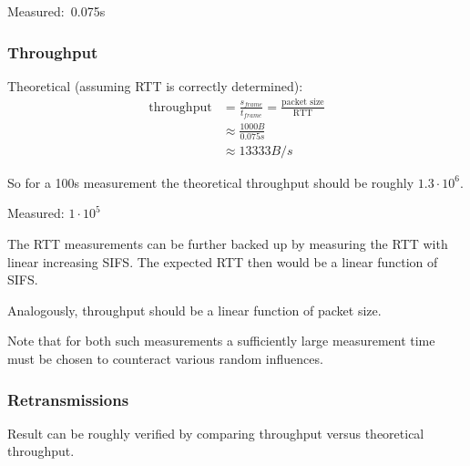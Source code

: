 \documentclass{article}
\begin{document}
\bigskip

Measured:~0.075s 

\subsubsection{Throughput}

\bigskip

Theoretical (assuming RTT is correctly determined):
\begin{equation*}
\begin{split}
	\text{throughput} & = \frac{s_{frame}}{t_{frame}} = \frac{\text{packet size}}{\text{RTT}} \\
	& \approx \frac{1000B}{0.075s} \\
	& \approx 13333B/s
\end{split}
\end{equation*}

So for a 100s measurement the theoretical throughput should be roughly $1.3\cdot 10^6$.

Measured: $1 \cdot 10^5$

\bigskip

The RTT measurements can be further backed up by measuring the RTT with linear increasing SIFS. The expected RTT then would be a linear function of SIFS.

\bigskip

Analogously, throughput should be a linear function of packet size. 

\bigskip

Note that for both such measurements a sufficiently large measurement time must be chosen to counteract various random influences.

\subsubsection{Retransmissions}
Result can be roughly verified by comparing throughput versus theoretical throughput.
\end{document}
